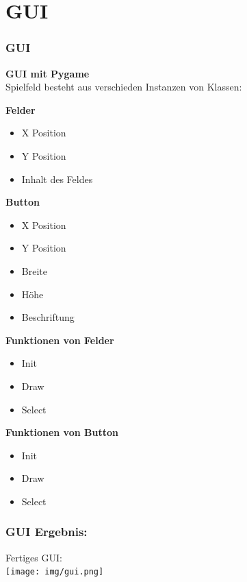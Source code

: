 \documentclass{beamer}
\begin{document}
\section{GUI}
\begin{frame}
	\frametitle{GUI} 

	\textbf{GUI mit Pygame}\\
	Spielfeld besteht aus verschieden Instanzen von Klassen:\\
	\begin{minipage}{0.48\textwidth}
	\textbf{Felder}
	\begin{itemize}
		\item X Position
		\item Y Position
		\item Inhalt des Feldes
	\end{itemize}
	\textbf{Button}
	\begin{itemize}
		\item X Position
		\item Y Position
		\item Breite
		\item Höhe
		\item Beschriftung
	\end{itemize}

\end{minipage}
\begin{minipage}{0.48\textwidth}
	\textbf{Funktionen von Felder}
	\begin{itemize}
		\item Init
		\item Draw
		\item Select
	\end{itemize}

\textbf{Funktionen von Button}
\begin{itemize}
	\item Init
	\item Draw
	\item Select
\end{itemize}
\end{minipage}
\end{frame}

\begin{frame}
	\frametitle{GUI Ergebnis:} 
	Fertiges GUI:\\
	\centering
	\texttt{[image: img/gui.png]}
\end{frame}
\end{document}

